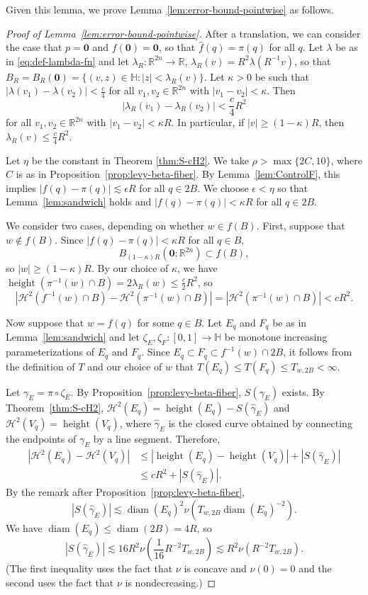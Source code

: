 \documentclass[12pt,reqno]{amsart}
\newcommand{\cH}{\mathcal{H}}
\DeclareMathOperator{\height}{height}
\newcommand{\HH}{\mathbb{H}}
\newcommand{\R}{\mathbb{R}}
\newcommand{\zero}{\mathbf{0}}
\newcommand{\from}{\colon}
\theoremstyle{remark}
\newcommand{\0}{\mathbf{0}}
\renewcommand{\1}{\mathbf 1}
\DeclareMathOperator{\diam}{diam}
\begin{document}
Given this lemma, we prove  Lemma~\ref{lem:error-bound-pointwise} as follows.
\begin{proof}[Proof of Lemma~\ref{lem:error-bound-pointwise}]
  After a translation, we can consider the case that $p=\zero$ and $f(\zero) = \zero$, so that $\hat{f}(q) = \pi(q)$ for all $q$.
  Let $\lambda$ be as in \eqref{eq:def-lambda-fn} and let $\lambda_R\from \R^{2n}\to \R$, $\lambda_R(v)=R^2\lambda(R^{-1}v)$, so that $B_R = B_R(\zero) = \{(v,z)\in \HH : |z| < \lambda_R(v)\}$. Let $\kappa>0$ be such that $|\lambda(v_1)-\lambda(v_2)|<\frac{c}{4}$ for all $v_1,v_2\in \R^{2n}$ with $|v_1-v_2|<\kappa$. Then 
  $$|\lambda_R(v_1)-\lambda_R(v_2)|<\frac{c}{4}R^2$$
  for all $v_1,v_2\in \R^{2n}$ with $|v_1-v_2|<\kappa R$. In particular, if $|v| \ge (1-\kappa)R$, then $\lambda_R(v) \le \frac{c}{4}R^2$.

  Let $\eta$ be the constant in Theorem \ref{thm:S-cH2}. We take $\rho > \max\{2C, 10\}$, where $C$ is as in Proposition~\ref{prop:levy-beta-fiber}. By Lemma~\ref{lem:ControlF}, this implies $|f(q) - \pi(q)| \lesssim \epsilon R$ for all $q\in 2B$. We choose $\epsilon <\eta$ so that  Lemma~\ref{lem:sandwich} holds and $|f(q) - \pi(q)| < \kappa R$ for all $q\in 2B$. 

  We consider two cases, depending on whether $w\in f(B)$.
  First, suppose that $w\not \in f(B)$. Since $|f(q) - \pi(q)| < \kappa R$ for all $q\in B$,
  $$B_{(1-\kappa)R}(\zero;\R^{2n})\subset f(B),$$
  so $|w| \ge (1 - \kappa)R$. By our choice of $\kappa$, we have $\height(\pi^{-1}(w) \cap B) = 2\lambda_R(w)\le \frac{c}{2} R^2$, so
  $$|\cH^2(f^{-1}(w)\cap B) - \cH^2(\pi^{-1}(w)\cap B)| = |\cH^2(\pi^{-1}(w)\cap B)| < c R^2.$$

  Now suppose that $w=f(q)$ for some $q\in B$.
  Let $E_q$ and $F_q$ be as in Lemma~\ref{lem:sandwich} and let $\zeta_E, \zeta_F\from [0,1] \to \HH$ be monotone increasing parameterizations of $E_q$ and $F_q$. Since $E_q \subset F_q \subset f^{-1}(w)\cap 2B$, it follows from the definition of $T$ and our choice of $w$ that $T(E_q) \le T(F_q) \le T_{w,2B}<\infty$.

  Let $\gamma_E = \pi\circ \zeta_E$. By Proposition~\ref{prop:levy-beta-fiber}, $S(\gamma_E)$ exists. By Theorem~\ref{thm:S-cH2}, $\cH^2(E_q) = \height(E_q) - S(\hat{\gamma}_E)$ and $\cH^2(V_q) = \height(V_q)$,
  where $\hat{\gamma}_E$ is the closed curve obtained by connecting the endpoints of $\gamma_E$ by a line segment. Therefore, 
  \[
  \begin{aligned}
  |\cH^2(E_q) - \cH^2(V_q)| &\le |\height(E_q) - \height(V_q)| + |S(\hat{\gamma}_E)| \\
  &\le c R^2 + |S(\hat{\gamma}_E)|.
  \end{aligned}
  \]
  By the remark after Proposition~\ref{prop:levy-beta-fiber},
  $$|S(\hat{\gamma}_{E})| \lesssim \diam(E_q)^2 \nu\left(T_{w,2B}\diam(E_q)^{-2}\right).$$
  We have $\diam(E_q)\le \diam(2B) = 4R$, so 
  $$|S(\hat{\gamma}_{E})| \lesssim 16 R^2  \nu\left(\frac{1}{16}R^{-2}T_{w,2B} \right) \lesssim  R^2 \nu\left(R^{-2}T_{w,2B} \right).$$
  (The first inequality uses the fact that $\nu$ is concave and $\nu(0)=0$ and the second uses the fact that $\nu$ is nondecreasing.)


\end{proof}
\end{document}
